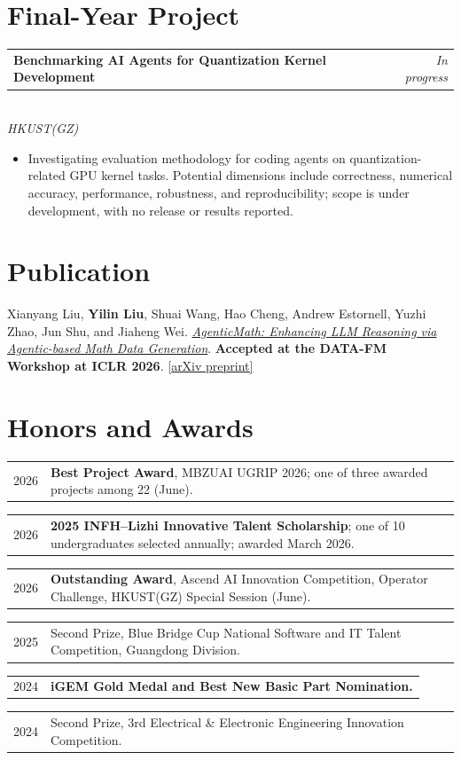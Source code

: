 \documentclass[10pt,a4paper]{article}
\makeatletter
\newcommand{\entry}[3]{%
  \begin{tabularx}{\textwidth}{@{}Xr@{}}
    \textbf{#1} & \textit{#2}
  \end{tabularx}\\[-1pt]
  \textit{#3}
}
\newcommand{\award}[2]{%
  \begin{tabularx}{\textwidth}{@{}p{0.09\textwidth}X@{}}
    #1 & #2
  \end{tabularx}\par
}
\makeatother
\begin{document}
\section*{Final-Year Project}
\entry{Benchmarking AI Agents for Quantization Kernel Development}{In progress}
{HKUST(GZ)}
\begin{itemize}
  \item Investigating evaluation methodology for coding agents on quantization-related GPU kernel tasks. Potential dimensions include correctness, numerical accuracy, performance, robustness, and reproducibility; scope is under development, with no release or results reported.
\end{itemize}

\section*{Publication}
Xianyang Liu, \textbf{Yilin Liu}, Shuai Wang, Hao Cheng, Andrew Estornell, Yuzhi Zhao, Jun Shu, and Jiaheng Wei.
\href{https://openreview.net/forum?id=wrOXg95VoF}{\textit{AgenticMath: Enhancing LLM Reasoning via Agentic-based Math Data Generation}}.
\textbf{Accepted at the DATA-FM Workshop at ICLR 2026}.
\href{https://arxiv.org/abs/2510.19361}{[arXiv preprint]}

\section*{Honors and Awards}
\award{2026}{\textbf{Best Project Award}, MBZUAI UGRIP 2026; one of three awarded projects among 22 (June).}
\award{2026}{\textbf{2025 INFH--Lizhi Innovative Talent Scholarship}; one of 10 undergraduates selected annually; awarded March 2026.}
\award{2026}{\textbf{Outstanding Award}, Ascend AI Innovation Competition, Operator Challenge, HKUST(GZ) Special Session (June).}
\award{2025}{Second Prize, Blue Bridge Cup National Software and IT Talent Competition, Guangdong Division.}
\award{2024}{\textbf{iGEM Gold Medal and Best New Basic Part Nomination.}}
\award{2024}{Second Prize, 3rd Electrical \& Electronic Engineering Innovation Competition.}
\end{document}
